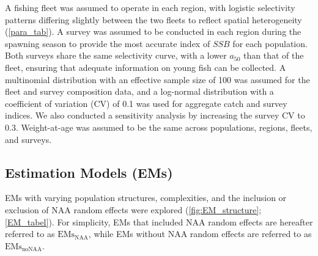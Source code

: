 \documentclass[
  12pt,
]{article}
\begin{document}
A fishing fleet was assumed to operate in each region, with logistic
selectivity patterns differing slightly between the two fleets to
reflect spatial heterogeneity (\autoref{para_tab}). A survey was assumed
to be conducted in each region during the spawning season to provide the
most accurate index of \(SSB\) for each population. Both surveys share
the same selectivity curve, with a lower \(a_{50}\) than that of the
fleet, ensuring that adequate information on young fish can be
collected. A multinomial distribution with an effective sample size of
100 was assumed for the fleet and survey composition data, and a
log-normal distribution with a coefficient of variation (CV) of 0.1 was
used for aggregate catch and survey indices. We also conducted a
sensitivity analysis by increasing the survey CV to 0.3. Weight-at-age
was assumed to be the same across populations, regions, fleets, and
surveys.

\hypertarget{estimation-models-ems}{%
\subsection{Estimation Models (EMs)}\label{estimation-models-ems}}

EMs with varying population structures, complexities, and the inclusion
or exclusion of NAA random effects were explored
(\autoref{fig:EM_structure}; \autoref{EM_tabel}). For simplicity, EMs
that included NAA random effects are hereafter referred to as
\(\text{EMs}_{\scriptscriptstyle \text{NAA}}\), while EMs without NAA
random effects are referred to as
\(\text{EMs}_{\scriptscriptstyle \text{noNAA}}\).
\end{document}
